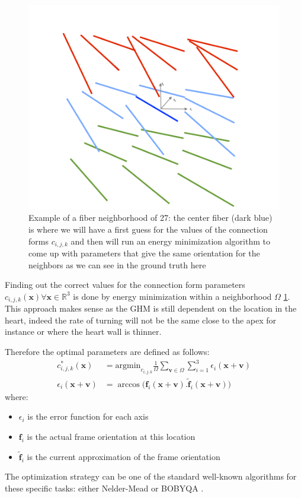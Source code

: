 \begin{figure}
    \centering
    \includegraphics[width=.5\textwidth]{figures/fibers_neighborhood3d}
    \caption{Example of a fiber neighborhood of 27: the center fiber (dark blue) is where we will have a first guess for the values of the connection forms $c_{i,j,k}$ and then will run an energy minimization algorithm to come up with parameters that give the same orientation for the neighbors as we can see in the ground truth here}
    \label{fig:fibers_neighborhood3d}
\end{figure}

Finding out the correct values for the connection form parameters $c_{i,j,k}(\mathbf{x}) \forall \mathbf{x} \in \mathbb{R}^3$ is done by energy minimization within a neighborhood $\Omega$ \ref{fig:fibers_neighborhood3d}. This approach makes sense as the GHM is still dependent on the location in the heart, indeed the rate of turning will not be the same close to the apex for instance or where the heart wall is thinner.

Therefore the optimal parameters are defined as follows:
\begin{align*}
    c^*_{i,j,k}(\mathbf{x}) &= \text{argmin}_{c_{i,j,k}} \frac{1}{\Omega} \sum_{\mathbf{v} \in \Omega} \sum_{i = 1}^3 \epsilon_i(\mathbf{x} + \mathbf{v}) \\
    \epsilon_i(\mathbf{x} + \mathbf{v}) &= \arccos \Big( \mathbf{f}_i(\mathbf{x} + \mathbf{v}) . \mathbf{\tilde{f}}_i(\mathbf{x} + \mathbf{v}) \Big)
\end{align*}
where:
\begin{itemize}
    \item $\epsilon_i$ is the error function for each axis 
    \item $\mathbf{f}_i$ is the actual frame orientation at this location
    \item $\mathbf{\tilde{f}}_i$ is the current approximation of the frame orientation
\end{itemize}
The optimization strategy can be one of the standard well-known algorithms for these specific tasks: either Nelder-Mead \cite{press2007numerical} or BOBYQA \cite{powell2009bobyqa}.


